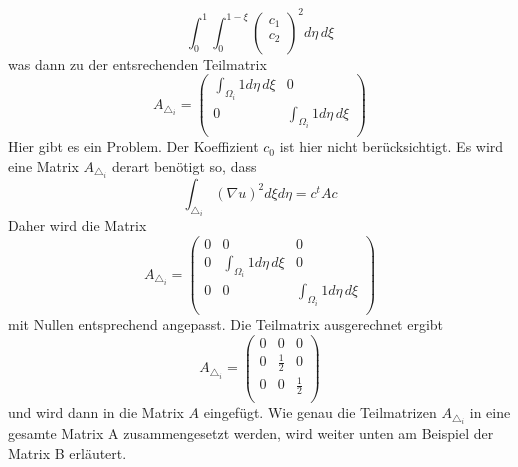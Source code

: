 \begin{equation}
			\int_0^1 \int_0^{1 - \xi} \left( \begin{array}{c} c_1 \\ c_2 \\	
\end{array} \right)^2 d\eta \, d\xi
			\label{fem:Minimal2LinAlgA}
\end{equation}
was dann zu der entsrechenden Teilmatrix
\begin{equation}
	A_{\triangle_i} = \left( \begin{array}{cc}
	\int_{\Omega_i} 1 d\eta \, d\xi & 0  \\ 
	0 & \int_{\Omega_i} 1 d\eta \, d\xi  \\
	\end{array}\right)
	\label{fem:TeilmatrixA}
\end{equation}
Hier gibt es ein Problem. Der Koeffizient $c_0$ ist hier nicht berücksichtigt. Es wird eine Matrix $A_{\triangle_i}$ derart benötigt so, dass
 \begin{equation}
	\int_{\triangle_i} (\nabla u)^2 d\xi d\eta = c^tAc
	\label{fem:KeiAhnig}
\end{equation}
Daher wird die Matrix
\begin{equation}
	A_{\triangle_i} = \left( \begin{array}{ccc}
	0 & 0 & 0 \\
	0 &  \int_{\Omega_i} 1 d\eta \, d\xi & 0  \\ 
	0 & 0 & \int_{\Omega_i} 1 d\eta \, d\xi  \\
	\end{array}\right)
	\label{fem:TeilmatrixA}
\end{equation}
mit Nullen entsprechend angepasst. Die Teilmatrix ausgerechnet ergibt
\begin{equation}
	A_{\triangle_i} = \left( \begin{array}{ccc}
	0 & 0 & 0 \\
	0 & \frac{1}{2} & 0  \\ 
	0 & 0 &  \frac{1}{2}\\
	\end{array}\right)
\end{equation}
und wird dann in die Matrix $A$ eingefügt. Wie genau die Teilmatrizen $A_{\triangle_i}$ in eine gesamte Matrix A zusammengesetzt werden, wird weiter unten am Beispiel der Matrix B erläutert. 

